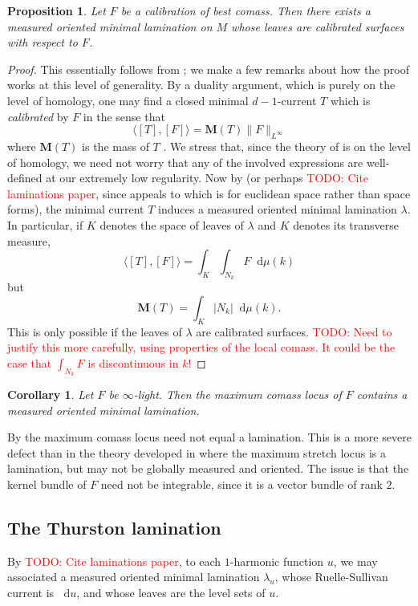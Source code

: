 \documentclass[reqno,11pt]{amsart}
\newcommand*\dif{\mathop{}\!\mathrm{d}}
\newcommand{\dfn}[1]{\emph{#1}\index{#1}}
\newtheorem{proposition}[theorem]{Proposition}
\newtheorem{corollary}[theorem]{Corollary}
\theoremstyle{definition}
\numberwithin{equation}{section}
\newcommand\todo[1]{\textcolor{red}{TODO: #1}}
\begin{document}
\begin{proposition}\label{Bangert Cui}
Let $F$ be a calibration of best comass.
Then there exists a measured oriented minimal lamination on $M$ whose leaves are calibrated surfaces with respect to $F$.
\end{proposition}
\begin{proof}
This essentially follows from \cite[Theorem 5.1]{bangert_cui_2017}; we make a few remarks about how the proof works at this level of generality.
By a duality argument, which is purely on the level of homology, one may find a closed minimal $d-1$-current $T$ which is \dfn{calibrated} by $F$ in the sense that
$$\langle [T], [F]\rangle = \mathbf M(T) \|F\|_{L^\infty}$$
where $\mathbf M(T)$ is the mass of $T$ \cite[Proposition 2.2]{bangert_cui_2017}.
We stress that, since the theory of \cite[\S2C]{bangert_cui_2017} is on the level of homology, we need not worry that any of the involved expressions are well-defined at our extremely low regularity.
Now by \cite[Theorem 1]{AUER20011095} (or perhaps \todo{Cite laminations paper}, since \cite{AUER20011095} appeals to \cite[\S37]{Simon84} which is for euclidean space rather than space forms), the minimal current $T$ induces a measured oriented minimal lamination $\lambda$.
In particular, if $K$ denotes the space of leaves of $\lambda$ and $K$ denotes its transverse measure,
$$\langle [T], [F]\rangle = \int_K \int_{N_k} F \dif \mu(k)$$
but 
$$\mathbf M(T) = \int_K |N_k| \dif \mu(k).$$
This is only possible if the leaves of $\lambda$ are calibrated surfaces.
\todo{Need to justify this more carefully, using properties of the local comass. It could be the case that $\int_{N_k} F$ is discontinuous in $k$!}
\end{proof}

\begin{corollary}\label{best comass lamination}
Let $F$ be $\infty$-light.
Then the maximum comass locus of $F$ contains a measured oriented minimal lamination.
\end{corollary}

By \cite[Example 5.4]{bangert_cui_2017} the maximum comass locus need not equal a lamination.
This is a more severe defect than in the theory developed in \cite{Thurston98,daskalopoulos2020transverse} where the maximum stretch locus is a lamination, but may not be globally measured and oriented.
The issue is that the kernel bundle of $F$ need not be integrable, since it is a vector bundle of rank $2$.

\subsection{The Thurston lamination}
By \todo{Cite laminations paper}, to each $1$-harmonic function $u$, we may associated a measured oriented minimal lamination $\lambda_u$, whose Ruelle-Sullivan current is $\dif u$, and whose leaves are the level sets of $u$.
\end{document}
